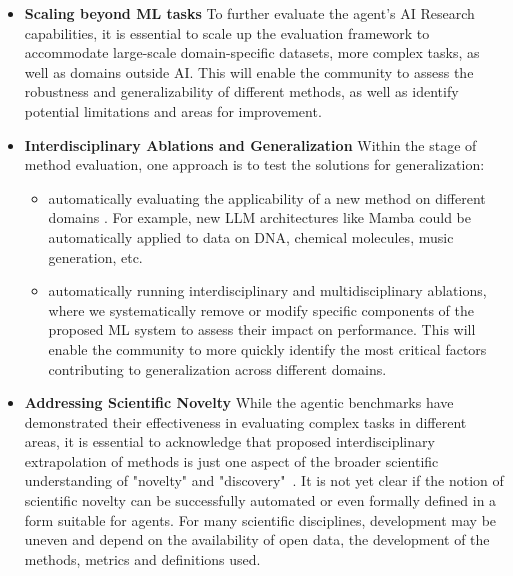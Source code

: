 \documentclass[]{fairmeta}
\begin{document}
\begin{itemize}
\item \textbf{Scaling beyond ML tasks}
To further evaluate the agent's AI Research capabilities, it is essential to scale up the evaluation framework to accommodate large-scale domain-specific datasets, more complex tasks, as well as domains outside AI. This will enable the community to assess the robustness and generalizability of different methods, as well as identify potential limitations and areas for improvement.

\item \textbf{Interdisciplinary Ablations and Generalization}
Within the stage of method evaluation, one approach is to test the solutions for generalization: 
\begin{itemize}
    \item automatically evaluating the applicability of a new method on different domains .
    For example, new LLM architectures like Mamba \citep{gu2024mambalineartimesequencemodeling} could be automatically applied to data on DNA, chemical molecules, music generation, etc.
    \item automatically running interdisciplinary and multidisciplinary ablations, where we systematically remove or modify specific components of the proposed ML system to assess their impact on performance. This will enable the community to more quickly identify the most critical factors contributing to generalization across different domains.
\end{itemize}


\item \textbf{Addressing Scientific Novelty}
While the agentic benchmarks have demonstrated their effectiveness in evaluating complex tasks in different areas, it is essential to acknowledge that proposed interdisciplinary extrapolation of methods is just one aspect of the broader scientific understanding of "novelty" and "discovery"~\citep{popper2005logic, langley1987scientific}. It is not yet clear if the notion of scientific novelty can be successfully automated or even formally defined in a form suitable for agents.
For many scientific disciplines, development may be uneven and depend on the availability of open data, the development of the methods, metrics and definitions used. 


\end{itemize}
\end{document}
